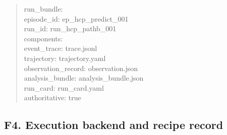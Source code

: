 \begin{quote}
run\_\allowbreak{}bundle:\\
episode\_\allowbreak{}id: ep\_\allowbreak{}hcp\_\allowbreak{}predict\_\allowbreak{}001\\
run\_\allowbreak{}id: run\_\allowbreak{}hcp\_\allowbreak{}pathb\_\allowbreak{}001\\
components:\\
event\_\allowbreak{}trace: trace.jsonl\\
trajectory: trajectory.yaml\\
observation\_\allowbreak{}record: observation.json\\
analysis\_\allowbreak{}bundle: analysis\_\allowbreak{}bundle.json\\
run\_\allowbreak{}card: run\_\allowbreak{}card.yaml\\
authoritative: true
\end{quote}

\subsection{\texorpdfstring{\textbf{F4. Execution backend and recipe record}}{F4. Execution backend and recipe record}}\label{f4.-execution-backend-and-recipe-record}

